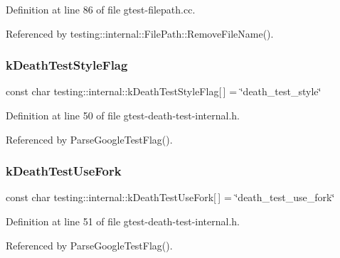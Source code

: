 Definition at line 86 of file gtest-\/filepath.\+cc.



Referenced by testing\+::internal\+::\+File\+Path\+::\+Remove\+File\+Name().

\mbox{\label{namespacetesting_1_1internal_a008ebfe0c0347d65e5e06e4d310981b3}} 
\subsubsection{\texorpdfstring{k\+Death\+Test\+Style\+Flag}{kDeathTestStyleFlag}}
{\footnotesize\ttfamily const char testing\+::internal\+::k\+Death\+Test\+Style\+Flag\mbox{[}$\,$\mbox{]} = \char`\"{}death\+\_\+test\+\_\+style\char`\"{}}



Definition at line 50 of file gtest-\/death-\/test-\/internal.\+h.



Referenced by Parse\+Google\+Test\+Flag().

\mbox{\label{namespacetesting_1_1internal_a32051e2574562b548be3e26a52eaa553}} 
\subsubsection{\texorpdfstring{k\+Death\+Test\+Use\+Fork}{kDeathTestUseFork}}
{\footnotesize\ttfamily const char testing\+::internal\+::k\+Death\+Test\+Use\+Fork\mbox{[}$\,$\mbox{]} = \char`\"{}death\+\_\+test\+\_\+use\+\_\+fork\char`\"{}}



Definition at line 51 of file gtest-\/death-\/test-\/internal.\+h.



Referenced by Parse\+Google\+Test\+Flag().

\mbox{\label{namespacetesting_1_1internal_a3d730761274e7b80dd66e5014171fcb5}} 
